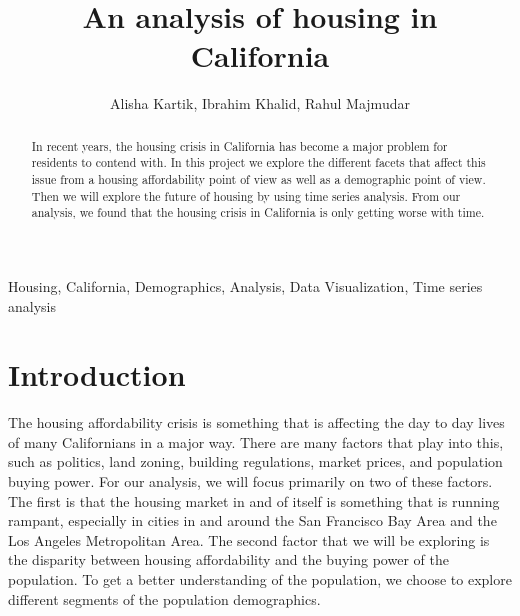 \documentclass[journal]{IEEEtran}
\begin{document}
\title{An analysis of housing in California}
\author{
	Alisha Kartik,
	Ibrahim Khalid,
	Rahul Majmudar%
}


\maketitle



\begin{abstract}

	In recent years, the housing crisis in California has become a major problem
	for residents to contend with. In this project we explore the different
	facets that affect this issue from a housing affordability point of view as
	well as a demographic point of view. Then we will explore the future of
	housing by using time series analysis. From our analysis, we found that the
	housing crisis in California is only getting worse with time.

\end{abstract}

\begin{IEEEkeywords}
	Housing, California, Demographics, Analysis, Data Visualization, Time series analysis
\end{IEEEkeywords}

\IEEEpeerreviewmaketitle



\section{Introduction}

The housing affordability crisis is something that is affecting the day to day
lives of many Californians in a major way. There are many factors that play
into this, such as politics, land zoning, building regulations, market prices,
and population buying power. For our analysis, we will focus primarily on two
of these factors. The first is that the housing market in and of itself is
something that is running rampant, especially in cities in and around the San
Francisco Bay Area and the Los Angeles Metropolitan Area. The second factor
that we will be exploring is the disparity between housing affordability and
the buying power of the population. To get a better understanding of the
population, we choose to explore different segments of the population
demographics.
\end{document}
